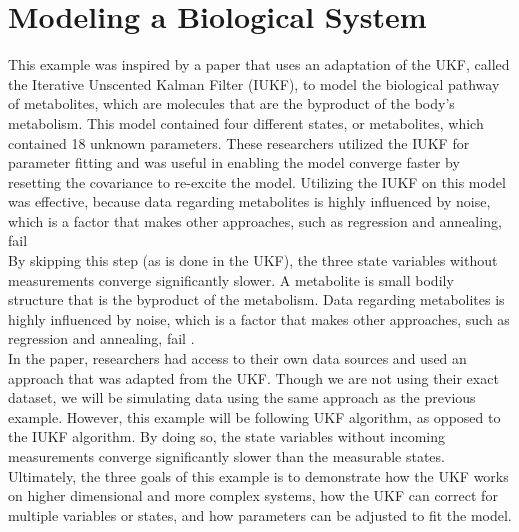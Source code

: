\section{Modeling a Biological System }
\label{Modeling a Biological System }




This example was inspired by a paper that uses an adaptation of the UKF, called the Iterative Unscented Kalman Filter (IUKF), to model the biological pathway of metabolites, which are molecules that are the byproduct of the body's metabolism. This model contained four different states, or metabolites, which contained 18 unknown parameters. These researchers utilized the IUKF for parameter fitting and was useful in enabling the model converge faster by resetting the covariance to re-excite the model. Utilizing the IUKF on this model was effective, because data regarding metabolites is highly influenced by noise, which is a factor that makes other approaches, such as regression and annealing, fail \cite{article5} \\ 

\noindent By skipping this step (as is done in the UKF), the three state variables without measurements converge significantly slower. A metabolite is small bodily structure that is the byproduct of the metabolism. Data regarding metabolites is highly influenced by noise, which is a factor that makes other approaches, such as regression and annealing, fail \cite{article5}. \\ 

\noindent In the paper, researchers had access to their own data sources and used an approach that was adapted from the UKF. Though we are not using their exact dataset, we will be simulating data using the same approach as the previous example. However, this example will be following UKF algorithm, as opposed to the IUKF algorithm. By doing so, the state variables without incoming measurements converge significantly slower than the measurable states. Ultimately, the three goals of this example is to demonstrate how the UKF works on higher dimensional and more complex systems, how the UKF can correct for multiple variables or states, and how parameters can be adjusted to fit the model. \\ 

